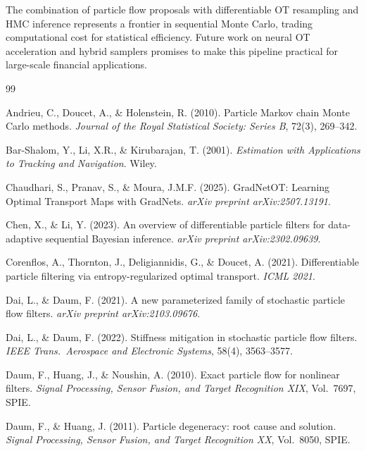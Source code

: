 \documentclass[12pt,a4paper]{article}
\theoremstyle{definition}
\theoremstyle{remark}
\begin{document}
The combination of particle flow proposals with differentiable OT resampling and HMC inference represents a frontier in sequential Monte Carlo, trading computational cost for statistical efficiency. Future work on neural OT acceleration and hybrid samplers promises to make this pipeline practical for large-scale financial applications.


\begin{thebibliography}{99}

Andrieu, C., Doucet, A., \& Holenstein, R. (2010).
Particle Markov chain Monte Carlo methods.
\textit{Journal of the Royal Statistical Society: Series B}, 72(3), 269--342.

Bar-Shalom, Y., Li, X.R., \& Kirubarajan, T. (2001).
\textit{Estimation with Applications to Tracking and Navigation}. Wiley.

Chaudhari, S., Pranav, S., \& Moura, J.M.F. (2025).
GradNetOT: Learning Optimal Transport Maps with GradNets.
\textit{arXiv preprint arXiv:2507.13191}.

Chen, X., \& Li, Y. (2023).
An overview of differentiable particle filters for data-adaptive sequential Bayesian inference.
\textit{arXiv preprint arXiv:2302.09639}.

Corenflos, A., Thornton, J., Deligiannidis, G., \& Doucet, A. (2021).
Differentiable particle filtering via entropy-regularized optimal transport.
\textit{ICML 2021}.

Dai, L., \& Daum, F. (2021).
A new parameterized family of stochastic particle flow filters.
\textit{arXiv preprint arXiv:2103.09676}.

Dai, L., \& Daum, F. (2022).
Stiffness mitigation in stochastic particle flow filters.
\textit{IEEE Trans.\ Aerospace and Electronic Systems}, 58(4), 3563--3577.

Daum, F., Huang, J., \& Noushin, A. (2010).
Exact particle flow for nonlinear filters.
\textit{Signal Processing, Sensor Fusion, and Target Recognition XIX}, Vol.~7697, SPIE.

Daum, F., \& Huang, J. (2011).
Particle degeneracy: root cause and solution.
\textit{Signal Processing, Sensor Fusion, and Target Recognition XX}, Vol.~8050, SPIE.


\end{thebibliography}
\end{document}
